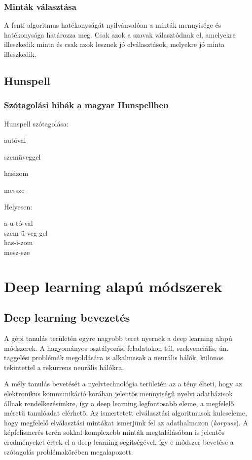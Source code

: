 \documentclass[a4paper, magyar]{article}
\begin{document}
\subsubsection{Minták választása}
A fenti algoritmus hatékonyságát nyilvánvalóan a minták mennyisége és hatékonysága határozza meg. Csak azok a szavak választódnak el, amelyekre illeszkedik minta és csak azok lesznek jó elválasztások, melyekre jó minta illeszkedik.

\subsection{Hunspell}
\subsubsection{Szótagolási hibák a magyar Hunspellben}


\begin{minipage}{0.5\textwidth}
	Hunspell szótagolása:
\begin{checkhyphens}
	autóval
	
	szemüveggel
	
	hasizom
	
	messze
\end{checkhyphens} 		
\end{minipage}\noindent
\begin{minipage}{0.5\textwidth}
	Helyesen:

	a-u-tó-val\\
	szem-ü-veg-gel\\
	has-i-zom\\
	mesz-sze
\end{minipage}


\section{Deep learning alapú módszerek}
\subsection{Deep learning bevezetés}
A gépi tanulás területén egyre nagyobb teret nyernek a deep learning alapú módszerek. A hagyományos osztályozási feladatokon túl, szekvenciális, ún. taggelési problémák megoldására is alkalmasak a neurális hálók, különös tekintettel a rekurrens neurális hálókra.

A mély tanulás bevetését a nyelvtechnológia területén az a tény élteti, hogy az elektronikus kommunikáció korában jelentős mennyiségű nyelvi adatbázisok állnak rendelkezésünkre, így a deep learning legfontosabb eleme, a megfelelő méretű tanulóadat elérhető. Az ismertetett elválasztási algoritmusok kulcseleme, hogy megfelelő elválasztási mintákat ismerjünk fel az adathalmazon (\textit{korpusz}). A képfelismerés terén sokkal komplexebb minták megtalálásában is jelentős eredményeket értek el a deep learning segítségével, így e módszer bevetése a szótagolás problémakörében megalapozott.
\end{document}
